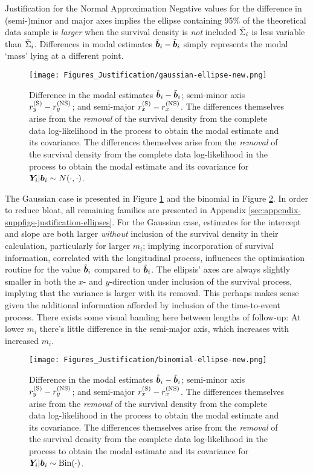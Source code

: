 \begin{chapter}{\label{cha:justification}Justification for the Normal Approximation}
  Negative values for the difference in (semi-)minor and major axes implies the ellipse containing 95\% of the theoretical data sample is \textit{larger} when the survival density is \textit{not} included \ie $\hat{\Sigma}_i$ is less variable than $\tilde{\Sigma}_i$. Differences in modal estimates $\hat{\bm{b}}_i-\tilde{\bm{b}}_i$ simply represents the modal `mass' lying at a different point.

  \begin{figure}[ht]
      \centering
      \texttt{[image: Figures\_Justification/gaussian-ellipse-new.png]}
      \caption{Difference in the modal estimates $\hat{\bm{b}}_i-\tilde{\bm{b}}_i$; semi-minor axis $r_y^{(\mathrm{S})}-r_y^{(\mathrm{NS})}$; and semi-major $r_x^{(\mathrm{S})}-r_x^{(\mathrm{NS})}$. The differences themselves arise from the \textit{removal} of the survival density from the complete data log-likelihood in the process to obtain the modal estimate and its covariance. The differences themselves arise from the \textit{removal} of the survival density from the complete data log-likelihood in the process to obtain the modal estimate and its covariance for $\bm{Y}_i|\bm{b}_i\sim N\!\left(\cdot,\cdot\right)$.}
      \label{fig:justification-ellipse-gaussian}
  \end{figure}
  
  The Gaussian case is presented in Figure \ref{fig:justification-ellipse-gaussian} and the binomial in Figure \ref{fig:justification-ellipse-binomial}. In order to reduce bloat, all remaining families are presented in Appendix \ref{sec:appendix-suppfigs-justification-ellipses}. For the Gaussian case, estimates for the intercept and slope are both larger \textit{without} inclusion of the survival density in their calculation, particularly for larger $m_i$; implying incorporation of survival information, correlated with the longitudinal process, influences the optimisation routine for the value $\hat{\bm{b}}_i$ compared to $\tilde{\bm{b}}_i$. The ellipsis' axes are always slightly smaller in both the $x$- and $y$-direction under inclusion of the survival process, implying that the variance is larger with its removal. This perhaps makes sense given the additional information afforded by inclusion of the time-to-event process. There exists some visual banding here between lengths of follow-up: At lower $m_i$ there's little difference in the semi-major axis, which increases with increased $m_i$.

  \begin{figure}[ht]
      \centering
      \texttt{[image: Figures\_Justification/binomial-ellipse-new.png]}
      \caption{Difference in the modal estimates $\hat{\bm{b}}_i-\tilde{\bm{b}}_i$; semi-minor axis $r_y^{(\mathrm{S})}-r_y^{(\mathrm{NS})}$; and semi-major $r_x^{(\mathrm{S})}-r_x^{(\mathrm{NS})}$. The differences themselves arise from the \textit{removal} of the survival density from the complete data log-likelihood in the process to obtain the modal estimate and its covariance. The differences themselves arise from the \textit{removal} of the survival density from the complete data log-likelihood in the process to obtain the modal estimate and its covariance for $\bm{Y}_i|\bm{b}_i\sim\mathrm{Bin}\!\left(\cdot\right)$.}
      \label{fig:justification-ellipse-binomial}
  \end{figure}


\end{chapter}
